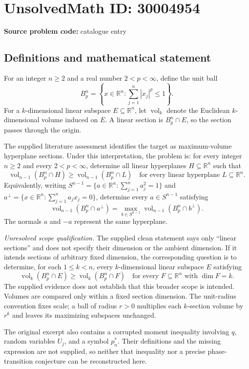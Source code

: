 \documentclass[11pt]{article}
\newcommand{\R}{\mathbb{R}}
\begin{document}
\section*{UnsolvedMath ID: 30004954}
\textbf{Source problem code:} catalogue entry
\subsection{Definitions and mathematical statement}
For an integer \(n\geq 2\) and a real number \(2<p<\infty\), define the unit ball
\[
B_p^n=\left\{x\in\R^n:\sum_{j=1}^n |x_j|^p\leq 1\right\}.
\]
For a \(k\)-dimensional linear subspace \(E\subseteq\R^n\), let \(\operatorname{vol}_k\) denote the Euclidean \(k\)-dimensional volume induced on \(E\). A linear section is \(B_p^n\cap E\), so the section passes through the origin.

The supplied literature assessment identifies the target as maximum-volume hyperplane sections. Under this interpretation, the problem is: for every integer \(n\geq 2\) and every \(2<p<\infty\), determine all linear hyperplanes \(H\subseteq\R^n\) such that
\[
\operatorname{vol}_{n-1}(B_p^n\cap H)
\geq
\operatorname{vol}_{n-1}(B_p^n\cap L)
\quad\text{for every linear hyperplane }L\subseteq\R^n.
\]
Equivalently, writing \(S^{n-1}=\{a\in\R^n:\sum_{j=1}^n a_j^2=1\}\) and \(a^\perp=\{x\in\R^n:\sum_{j=1}^n a_jx_j=0\}\), determine every \(a\in S^{n-1}\) satisfying
\[
\operatorname{vol}_{n-1}(B_p^n\cap a^\perp)
=
\max_{b\in S^{n-1}}\operatorname{vol}_{n-1}(B_p^n\cap b^\perp).
\]
The normals \(a\) and \(-a\) represent the same hyperplane.

\emph{Unresolved scope qualification.} The supplied clean statement says only ``linear sections'' and does not specify their dimension or the ambient dimension. If it intends sections of arbitrary fixed dimension, the corresponding question is to determine, for each \(1\leq k<n\), every \(k\)-dimensional linear subspace \(E\) satisfying
\[
\operatorname{vol}_k(B_p^n\cap E)
\geq
\operatorname{vol}_k(B_p^n\cap F)
\quad\text{for every }F\subseteq\R^n\text{ with }\dim F=k.
\]
The supplied evidence does not establish that this broader scope is intended. Volumes are compared only within a fixed section dimension. The unit-radius convention fixes scale; a ball of radius \(r>0\) multiplies each \(k\)-section volume by \(r^k\) and leaves its maximizing subspaces unchanged.

The original excerpt also contains a corrupted moment inequality involving \(q\), random variables \(U_j\), and a symbol \(p_n^*\). Their definitions and the missing expression are not supplied, so neither that inequality nor a precise phase-transition conjecture can be reconstructed here.
\end{document}
